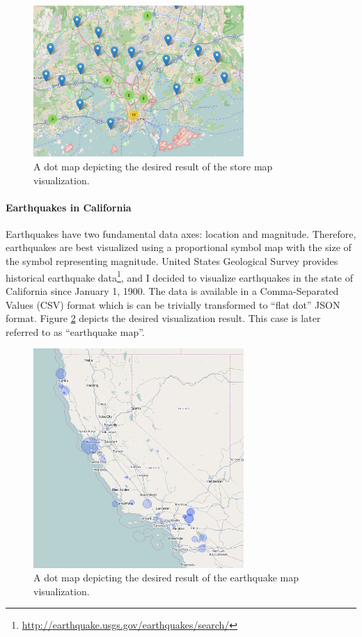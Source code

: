 \begin{figure}[htbp]
  \begin{center}
    \includegraphics[width=8cm]{images/dotmap-example-thematic.png}
    \caption{A dot map depicting the desired result of the store map visualization.}
    \label{fig:storemapresult}
  \end{center}
\end{figure}

\paragraph{Earthquakes in California}
Earthquakes have two fundamental data axes: location and magnitude. Therefore, earthquakes are best visualized using a proportional symbol map with the size of the symbol representing magnitude. United States Geological Survey provides historical earthquake data\footnote{\url{http://earthquake.usgs.gov/earthquakes/search/}}, and I decided to visualize earthquakes in the state of California since January 1, 1900. The data is available in a Comma-Separated Values (CSV) format which is can be trivially transformed to ``flat dot'' JSON format. Figure \ref{fig:quakemapresult} depicts the desired visualization result. This case is later referred to as ``earthquake map''.

\begin{figure}[htbp]
  \begin{center}
    \includegraphics[width=8cm]{images/proportionalsymbol-example-thematic.png}
    \caption{A dot map depicting the desired result of the earthquake map visualization.}
    \label{fig:quakemapresult}
  \end{center}
\end{figure}

